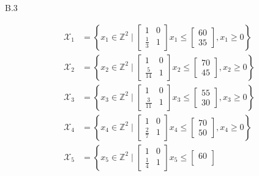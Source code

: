 \documentclass[a4paper]{article}
\begin{document}
\begin{exercise}{B.3}
\begin{enumerate}[label=(\roman*)]
        \begin{align*}
          \mathscr{X}_1 &= \left\{ x_1 \in \mathbb{Z}^2 \mid \begin{bmatrix}
              1 & 0 \\
              \frac{1}{3} & 1
          \end{bmatrix} x_1\leq \begin{bmatrix}
            60 \\
            35
          \end{bmatrix}, x_1 \geq 0 \right\} \\
          \mathscr{X}_2 &= \left\{ x_2 \in \mathbb{Z}^2 \mid \begin{bmatrix}
              1 & 0 \\
              \frac{5}{14} & 1
          \end{bmatrix}x_2 \leq \begin{bmatrix}
            70 \\
            45
          \end{bmatrix}, x_2 \geq 0 \right\} \\
          \mathscr{X}_3 &= \left\{ x_3 \in \mathbb{Z}^2 \mid \begin{bmatrix}
              1 & 0 \\
              \frac{3}{11} & 1
          \end{bmatrix}x_3 \leq \begin{bmatrix}
            55 \\
            30
          \end{bmatrix}, x_3 \geq 0 \right\} \\
          \mathscr{X}_4 &= \left\{ x_4 \in \mathbb{Z}^2 \mid \begin{bmatrix}
              1 & 0 \\
              \frac{2}{7} & 1
          \end{bmatrix}x_4 \leq \begin{bmatrix}
            70 \\
            50
          \end{bmatrix}, x_4 \geq 0 \right\} \\
          \mathscr{X}_5 &= \left\{ x_5 \in \mathbb{Z}^2 \mid \begin{bmatrix}
              1 & 0 \\
              \frac{1}{4} & 1
          \end{bmatrix}x_5 \leq \begin{bmatrix}
            60 \\

\end{bmatrix}
\end{align*}
\end{enumerate}
\end{exercise}
\end{document}
